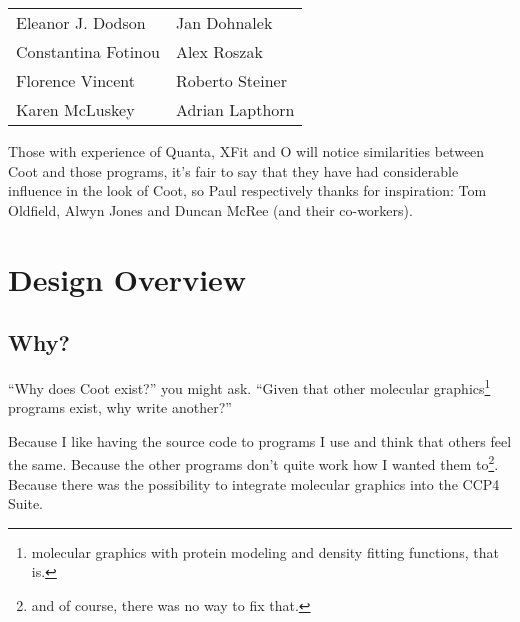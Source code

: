 \documentclass{book}
\begin{document}

\begin{tabular}{ll}
Eleanor J. Dodson & Jan Dohnalek \\
Constantina Fotinou & Alex Roszak  \\
Florence Vincent  & Roberto Steiner \\
Karen McLuskey & Adrian Lapthorn   
\end{tabular}

\vspace{5mm}

Those with experience of Quanta, XFit and O will notice similarities
between Coot and those programs, it's fair to say that they have had
considerable influence in the look of Coot, so Paul respectively
thanks for inspiration: Tom Oldfield, Alwyn Jones and Duncan McRee
(and their co-workers).

\chapter{Design Overview}
\section{Why?}
``Why does Coot exist?'' you might ask.  ``Given that other molecular
graphics\footnote{molecular graphics with protein modeling and
  density fitting functions, that is.} programs exist, why write
another?''

Because I like having the source code to programs I use and think that
others feel the same.  Because the other programs don't quite work how
I wanted them to\footnote{and of course, there was no way to fix
  that.}. Because there was the possibility to integrate molecular
graphics into the CCP4 Suite.  
\end{document}
